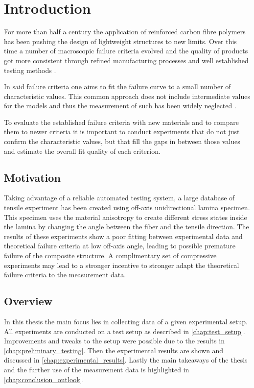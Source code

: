 \chapter{Introduction}
\label{chap:\currfilebase}

For more than half a century the application of reinforced carbon fibre polymers has been pushing the design of lightweight structures to new limits. Over this time a number of macroscopic failure criteria evolved and the quality of products got more consistent through refined manufacturing processes \cite{gurit2017guide} and well established testing methods \cite{calsson2014experimental}.

In said failure criteria one aims to fit the failure curve to a small number of characteristic values. This common approach does not include intermediate values for the models and thus the measurement of such has been widely neglected \cite{daniel2016yield}.

To evaluate the established failure criteria with new materials and to compare them to newer criteria \cite{daniel2007failure,daniel2016yield} it is important to conduct experiments that do not just confirm the characteristic values, but that fill the gaps in between those values and estimate the overall fit quality of each criterion.

\section{Motivation}
\label{sec:motivation}

Taking advantage of a reliable automated testing system, a large database of tensile experiment has been created using off-axis unidirectional lamina specimen. This specimen uses the material anisotropy to create different stress states inside the lamina by changing the angle between the fiber and the tensile direction. The results of these experiments show a poor fitting between experimental data and theoretical failure criteria at low off-axis angle, leading to possible premature failure of the composite structure. A complimentary set of compressive experiments may lead to a stronger incentive to stronger adapt the theoretical failure criteria to the measurement data.

\section{Overview}
\label{sec:overview}

In this thesis the main focus lies in collecting data of a given experimental setup. All experiments are conducted on a test setup as described in \autoref{chap:test_setup}. Improvements and tweaks to the setup were possible due to the results in \autoref{chap:preliminary_testing}. Then the experimental results are shown and discussed in \autoref{chap:experimental_results}. Lastly the main takeaways of the thesis and the further use of the measurement data is highlighted in \autoref{chap:conclusion_outlook}.